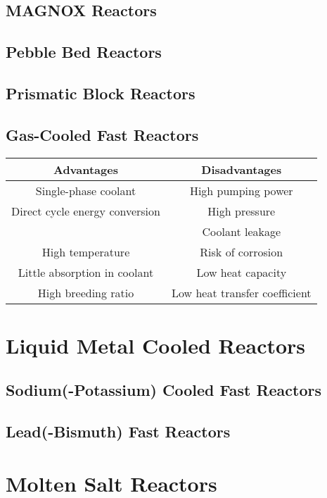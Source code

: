 \subsection{MAGNOX Reactors}

\subsection{Pebble Bed Reactors}

\subsection{Prismatic Block Reactors}

\subsection{Gas-Cooled Fast Reactors}
\begin{table}[!h]
\begin{tabular}{c|c}
  Advantages & Disadvantages \\
  \hline
  Single-phase coolant & High pumping power \\
  Direct cycle energy conversion & High pressure\\
   & Coolant leakage \\
  High temperature & Risk of corrosion \\
  Little absorption in coolant & Low heat capacity\\
  High breeding ratio & Low heat transfer coefficient\\
\end{tabular}
\end{table}


\section{Liquid Metal Cooled Reactors}

\subsection{Sodium(-Potassium) Cooled Fast Reactors}

\subsection{Lead(-Bismuth) Fast Reactors}


\section{Molten Salt Reactors}

